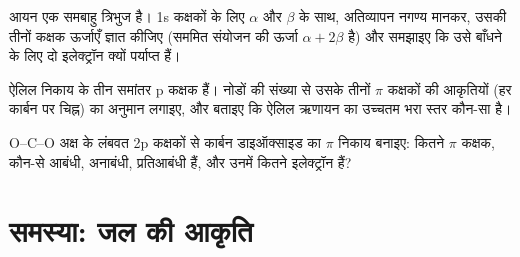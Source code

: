 \begin{exercise}[$\star\star\star$]\label{exo:b2:fragment-orbitals:10}
 आयन एक समबाहु त्रिभुज है। 1s कक्षकों के लिए $\alpha$ और $\beta$ के साथ,
अतिव्यापन नगण्य मानकर, उसकी तीनों कक्षक ऊर्जाएँ ज्ञात कीजिए (सममित
संयोजन की ऊर्जा $\alpha + 2\beta$ है) और समझाइए कि उसे बाँधने के लिए दो इलेक्ट्रॉन
क्यों पर्याप्त हैं।
\end{exercise}

\begin{exercise}[$\star\star\star$]\label{exo:b2:fragment-orbitals:11}
ऐलिल निकाय  के तीन समांतर p कक्षक हैं। नोडों की संख्या से उसके तीनों
$\pi$ कक्षकों की आकृतियों (हर कार्बन पर चिह्न) का अनुमान लगाइए, और बताइए कि
ऐलिल ऋणायन का उच्चतम भरा स्तर कौन-सा है।
\end{exercise}

\begin{exercise}[$\star\star\star$]\label{exo:b2:fragment-orbitals:12}
O--C--O अक्ष के लंबवत 2p कक्षकों से कार्बन डाइऑक्साइड का $\pi$ निकाय
बनाइए: कितने $\pi$ कक्षक, कौन-से आबंधी, अनाबंधी,
प्रतिआबंधी हैं, और उनमें कितने इलेक्ट्रॉन हैं?
\end{exercise}

\section{समस्या: जल की आकृति}

